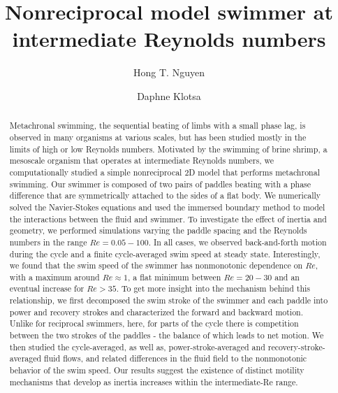 \documentclass[%
 onecolumn,
superscriptaddress,
 amsmath,amssymb,
 aps,
longbibliography
]{revtex4-2}
\begin{document}

\title{Nonreciprocal model swimmer at intermediate Reynolds numbers}%


\author{Hong T. Nguyen} 

\author{Daphne Klotsa} 



\begin{abstract}
Metachronal swimming, the sequential beating of limbs with a small phase lag, is observed in many organisms at various scales, but has been studied mostly in the limits of high or low Reynolds numbers. 
Motivated by the swimming of brine shrimp, a mesoscale organism that operates at intermediate Reynolds numbers, we computationally studied a simple nonreciprocal 2D model that performs metachronal swimming. Our swimmer is composed of two pairs of paddles beating with a phase difference that are symmetrically attached to the sides of a flat body. We numerically solved the Navier-Stokes equations and used the immersed boundary method to model the interactions between the fluid and swimmer. To investigate the effect of inertia and geometry, we performed simulations varying the paddle spacing and the Reynolds numbers in the range $Re = 0.05 - 100$. In all cases, we observed back-and-forth motion during the cycle and a finite cycle-averaged swim speed at steady state. Interestingly, we found that the swim speed of the swimmer has nonmonotonic dependence on $Re$, with a maximum around $Re\approx1$, a flat minimum between $Re=20-30$ and an eventual increase for $Re>35$. To get more insight into the mechanism behind this relationship, we first decomposed the swim stroke of the swimmer and each paddle into power and recovery strokes and characterized the forward and backward motion. Unlike for reciprocal swimmers, here, for parts of the cycle there is competition between the two strokes of the paddles - the balance of which leads to net motion. We then studied the cycle-averaged, as well as, power-stroke-averaged and recovery-stroke-averaged fluid flows, and related differences in the fluid field to the nonmonotonic behavior of the swim speed. Our results suggest the existence of distinct motility mechanisms that develop as inertia increases within the intermediate-Re range. 


\end{abstract}
\end{document}
